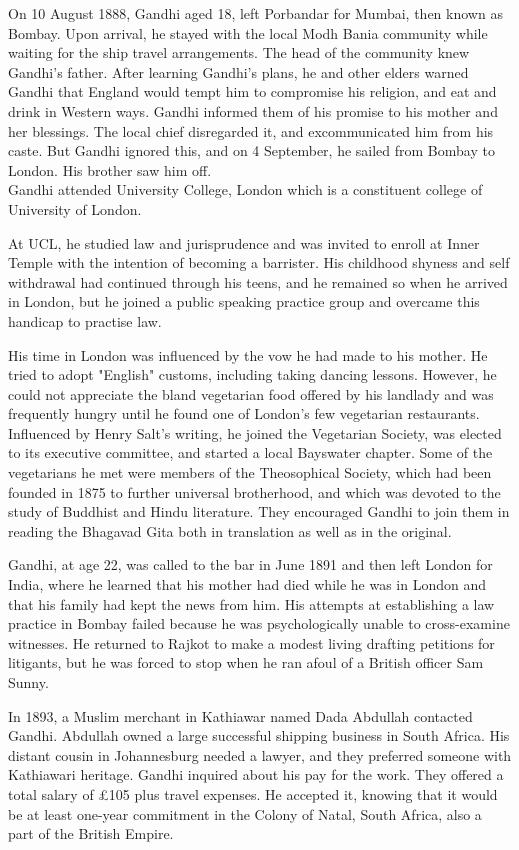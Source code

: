 On 10 August 1888, Gandhi aged 18, left Porbandar for Mumbai, then known
as Bombay. Upon arrival, he stayed with the local Modh Bania community
while waiting for the ship travel arrangements. The head of the
community knew Gandhi's father. After learning Gandhi's plans, he and
other elders warned Gandhi that England would tempt him to compromise
his religion, and eat and drink in Western ways. Gandhi informed them of
his promise to his mother and her blessings. The local chief disregarded
it, and excommunicated him from his caste. But Gandhi ignored this, and
on 4 September, he sailed from Bombay to London. His brother saw him
off.\\
Gandhi attended University College, London which is a constituent
college of University of London.

At UCL, he studied law and jurisprudence and was invited to enroll at
Inner Temple with the intention of becoming a barrister. His childhood
shyness and self withdrawal had continued through his teens, and he
remained so when he arrived in London, but he joined a public speaking
practice group and overcame this handicap to practise law.

His time in London was influenced by the vow he had made to his mother.
He tried to adopt "English" customs, including taking dancing lessons.
However, he could not appreciate the bland vegetarian food offered by
his landlady and was frequently hungry until he found one of London's
few vegetarian restaurants. Influenced by Henry Salt's writing, he
joined the Vegetarian Society, was elected to its executive committee,
and started a local Bayswater chapter. Some of the vegetarians he met
were members of the Theosophical Society, which had been founded in 1875
to further universal brotherhood, and which was devoted to the study of
Buddhist and Hindu literature. They encouraged Gandhi to join them in
reading the Bhagavad Gita both in translation as well as in the
original.

Gandhi, at age 22, was called to the bar in June 1891 and then left
London for India, where he learned that his mother had died while he was
in London and that his family had kept the news from him. His attempts
at establishing a law practice in Bombay failed because he was
psychologically unable to cross-examine witnesses. He returned to Rajkot
to make a modest living drafting petitions for litigants, but he was
forced to stop when he ran afoul of a British officer Sam Sunny.

In 1893, a Muslim merchant in Kathiawar named Dada Abdullah contacted
Gandhi. Abdullah owned a large successful shipping business in South
Africa. His distant cousin in Johannesburg needed a lawyer, and they
preferred someone with Kathiawari heritage. Gandhi inquired about his
pay for the work. They offered a total salary of £105 plus travel
expenses. He accepted it, knowing that it would be at least one-year
commitment in the Colony of Natal, South Africa, also a part of the
British Empire.

